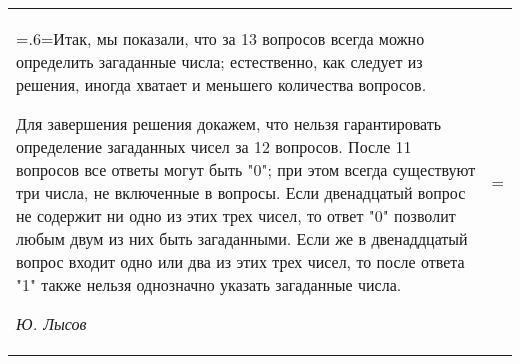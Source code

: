 \begin{tabularx}{0.95\textwidth}{>{\hsize=.6\hsize\linewidth=\hsize}X
			>{\hsize=1.5\hsize\linewidth=\hsize}X}
	Итак, мы показали, что за 13 вопросов всегда можно определить загаданные числа; естественно, как следует из решения, иногда хватает и меньшего количества вопросов. 
	
	Для завершения решения докажем, что нельзя гарантировать определение загаданных чисел за 12 вопросов. После 11 вопросов все ответы могут быть "0"; при этом всегда существуют три числа, не включенные в вопросы. Если двенадцатый вопрос не содержит ни одно из этих трех чисел, то ответ "0" позволит любым двум из них быть загаданными. Если же в двенаддцатый вопрос входит одно или два из этих трех чисел, то после ответа "1" также нельзя однозначно указать загаданные числа. 
	
	\begin{flushright}
		\textit{Ю. Лысов}
	\end{flushright}
\end{tabularx}